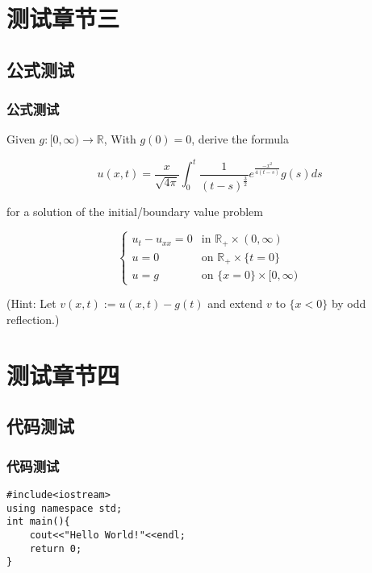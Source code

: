 \documentclass[presentation,aspectratio=1610]{beamer}
\begin{document}
\section{测试章节三}

\subsection{公式测试}

\begin{frame}
\frametitle{公式测试}
Given $ g:[0,∞) \to\mathbb{R} $, With $ g(0)=0 $, derive the formula

\begin{equation}
	u(x,t)=\frac{x}{\sqrt{4\pi}}\int_{0}^{t}\frac{1}{(t-s)^{\frac{3}{2}}}e^{\frac{-x^2}{4(t-s)}}g(s)ds
\end{equation}

for a solution of the initial/boundary value problem 

\[
	\begin{cases}
		u_t-u_{xx}  = 0   & \mbox{in }  \mathbb{R}_+ \times(0,\infty)\\
		u           = 0   & \mbox{on }  \mathbb{R}_+ \times\{t=0\}\\
		u           = g   & \mbox{on }  \{x=0\}\times[0,\infty)
	\end{cases}
\]

(Hint: Let $v(x, t) := u(x, t) − g(t)$ and extend $v$ to $\{x < 0\}$ by odd reflection.)
\end{frame}


\section{测试章节四}
\subsection{代码测试}

\begin{frame}[fragile] %
\frametitle{代码测试}
\begin{example}
\begin{verbatim}
#include<iostream>
using namespace std;
int main(){
    cout<<"Hello World!"<<endl;
    return 0;
}
\end{verbatim}
\end{example}
\end{frame}
\end{document}

